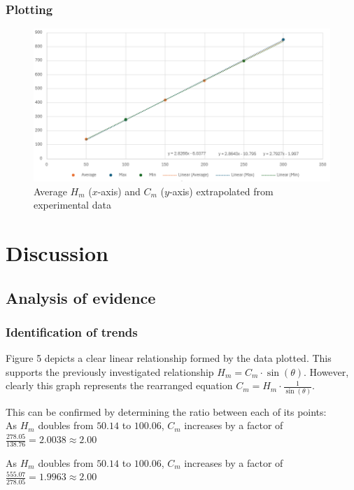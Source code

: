 \documentclass[11pt,a4paper]{article}
\begin{document}
\subsubsection{Plotting}

\begin{figure}[H]
\centering
\includegraphics[width=0.8\paperwidth]{newresults.png}
\caption{Average $H_m$ ($x$-axis) and $C_m$ ($y$-axis) extrapolated from experimental data}
\end{figure}




\section{Discussion}
\subsection{Analysis of evidence}
\subsubsection{Identification of trends}
Figure 5 depicts a clear linear relationship formed by the data plotted. This supports the previously investigated relationship  $H_m=C_m\cdot{\sin(\theta)}$. However, clearly this graph represents the rearranged equation $C_m=H_m\cdot \frac{1}{{\sin(\theta)}}$.


This can be confirmed by determining the ratio between each of its points:
\\

As $H_m$ doubles from $50.14$ to $100.06$, $C_m$ increases by a factor of $\frac{278.05}{138.76}=2.0038\approx2.00$

As $H_m$ doubles from $50.14$ to $100.06$, $C_m$ increases by a factor of $\frac{555.07}{278.05}=1.9963\approx2.00$

\hfill
\end{document}
